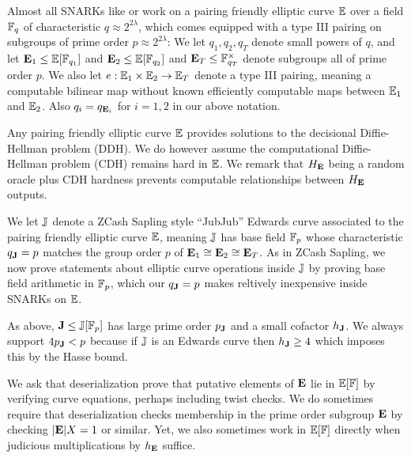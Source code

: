 \smallskip

Almost all SNARKs like \cite{groth16} or \cite{plonk} work on a pairing friendly elliptic curve ${\mathbb{E}}$ over a field $\mathbb{F}_q$ of characteristic $q \approx 2^{2\lambda}$, which comes equipped with a type III pairing on subgroups of prime order $p \approx 2^{2\lambda}$:  We let $q_1,q_2,q_T$ denote small powers of $q$, and let ${\mathbf{E}}_1 \le {\mathbb{E}}[\mathbb{F}_{q_1}]$ and ${\mathbf{E}}_2 \le {\mathbb{E}}[\mathbb{F}_{q_2}]$ and ${\mathbf{E}}_T \le \mathbb{F}_{q_T}^\times$ denote subgroups all of prime order $p$.  We also let $e : {\mathbb{E}}_1 \times {\mathbb{E}}_2 \to {\mathbb{E}}_T$ denote a type III pairing, meaning a computable bilinear map without known efficiently computable maps between ${\mathbb{E}}_1$ and ${\mathbb{E}}_2$.  Also $q_i = q_{{\mathbf{E}}_i}$ for $i=1,2$ in our above notation.  

Any pairing friendly elliptic curve ${\mathbb{E}}$ provides solutions to the decisional Diffie-Hellman problem (DDH).  We do however assume the computational Diffie-Hellman problem (CDH) remains hard in ${\mathbb{E}}$.  We remark that $H_{\mathbf{E}}$ being a random oracle plus CDH hardness prevents computable relationships between $H_{\mathbf{E}}$ outputs.


\smallskip


We let ${\mathbb{J}}$ denote a ZCash Sapling style ``JubJub'' Edwards curve associated to the pairing friendly elliptic curve ${\mathbb{E}}$, meaning ${\mathbb{J}}$ has base field $\mathbb{F}_p$ whose characteristic $q_{{\mathbf{J}}} = p$ matches the group order $p$ of ${\mathbf{E}}_1 \cong {\mathbf{E}}_2 \cong {\mathbf{E}}_T$.  As in ZCash Sapling, we now prove statements about elliptic curve operations inside ${\mathbb{J}}$ by proving base field arithmetic in $\mathbb{F}_p$, which our $q_{{\mathbf{J}}} = p$ makes reltively inexpensive inside SNARKs on ${\mathbb{E}}$.

As above, ${\mathbf{J}} \le {\mathbb{J}}[\mathbb{F}_p]$ has large prime order $p_{{\mathbf{J}}}$ and a small cofactor $h_{{\mathbf{J}}}$.  We always support $4 p_{{\mathbf{J}}} < p$ because if ${\mathbb{J}}$ is an Edwards curve then $h_{{\mathbf{J}}} \ge 4$ which imposes this by the Hasse bound.

\smallskip

We ask that deserialization prove that putative elements of ${\mathbf{E}}$ lie in ${\mathbb{E}}[\mathbb{F}]$ by verifying curve equations, perhaps including twist checks.  We do sometimes require that deserialization checks membership in the prime order subgroup ${\mathbf{E}}$ by checking $|{\mathbf{E}}| X = 1$ or similar.  Yet, we also sometimes work in ${\mathbb{E}}[\mathbb{F}]$ directly when judicious multiplications by $h_{{\mathbf{E}}}$ suffice.  

